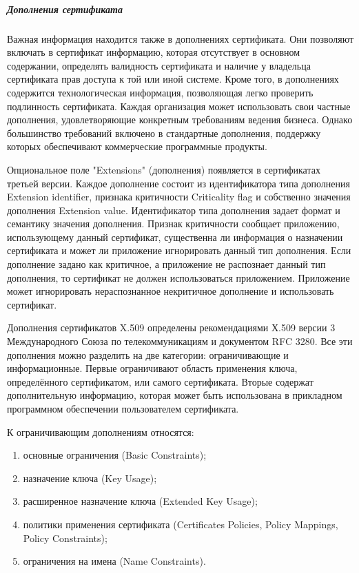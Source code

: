 \subparagraph{Дополнения сертификата }

Важная информация находится также в дополнениях сертификата. Они позволяют
включать в сертификат информацию, которая отсутствует в основном содержании,
определять валидность сертификата и наличие у владельца сертификата прав
доступа к той или иной системе. Кроме того, в дополнениях содержится
технологическая информация, позволяющая легко проверить подлинность
сертификата. Каждая организация может использовать свои частные дополнения,
удовлетворяющие конкретным требованиям ведения бизнеса. Однако большинство
требований включено в стандартные дополнения, поддержку которых обеспечивают
коммерческие программные продукты.

Опциональное поле "Extensions" (дополнения) появляется в сертификатах третьей
версии. Каждое дополнение состоит из идентификатора типа дополнения Extension
identifier, признака критичности Criticality flag и собственно значения
дополнения Extension value. Идентификатор типа дополнения задает формат и
семантику значения дополнения. Признак критичности сообщает приложению,
использующему данный сертификат, существенна ли информация о назначении
сертификата и может ли приложение игнорировать данный тип дополнения. Если
дополнение задано как критичное, а приложение не распознает данный тип
дополнения, то сертификат не должен использоваться приложением. Приложение
может игнорировать нераспознанное некритичное дополнение и использовать
сертификат.

Дополнения сертификатов X.509 определены рекомендациями Х.509 версии 3
Международного Союза по телекоммуникациям и документом RFC 3280. Все эти
дополнения можно разделить на две категории: ограничивающие и информационные.
Первые ограничивают область применения ключа, определённого сертификатом, или
самого сертификата. Вторые содержат дополнительную информацию, которая может
быть использована в прикладном программном обеспечении пользователем
сертификата.

\noindent К ограничивающим дополнениям относятся:
\begin{enumerate}
  \item основные ограничения (Basic Constraints);
  \item назначение ключа (Key Usage);
  \item расширенное назначение ключа (Extended Key Usage);
  \item политики применения сертификата (Certificates Policies, Policy
      Mappings, Policy Constraints);
  \item ограничения на имена (Name Constraints).
\end{enumerate}

